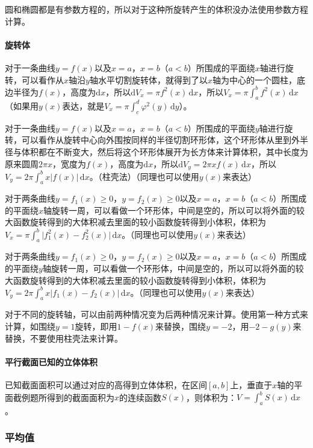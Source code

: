 \documentclass[UTF8, 12pt]{ctexart}
\begin{document}
圆和椭圆都是有参数方程的，所以对于这种所旋转产生的体积没办法使用参数方程计算。

\paragraph{旋转体} \leavevmode \medskip

对于一条曲线$y=f(x)$以及$x=a$，$x=b$（$a<b$）所围成的平面绕$x$轴进行旋转，可以看作从$x$轴沿$y$轴水平切割旋转体，就得到了以$x$轴为中心的一个圆柱，底边半径为$f(x)$，高度为$\textrm{d}x$，所以$\textrm{d}V_x=\pi f^2(x)\,\textrm{d}x$，所以$V_x=\pi\int_a^bf^2(x)\,\textrm{d}x$（如果用$y(x)$表达，就是$V_x=\pi\int_c^d\varphi^2(y)\,\textrm{d}y$）。

对于一条曲线$y=f(x)$以及$x=a$，$x=b$（$a<b$）所围成的平面绕$y$轴进行旋转，可以看作从旋转中心向外围按同样的半径切割环形体，这个环形体从里到外半径与体积都在不断变大，然后将这个环形体展开为长方体来计算体积，其中长度为原来圆周$2\pi x$，宽度为$f(x)$，高度为$\textrm{d}x$，所以$\textrm{d}V_y=2\pi xf(x)\,\textrm{d}x$，所以$V_y=2\pi\int_a^bx\vert f(x)\vert\,\textrm{d}x$。（柱壳法）（同理也可以使用$y(x)$来表达）

对于两条曲线$y=f_1(x)\geqslant0$，$y=f_2(x)\geqslant0$以及$x=a$，$x=b$（$a<b$）所围成的平面绕$x$轴旋转一周，可以看做一个环形体，中间是空的，所以可以将外面的较大函数旋转得到的大体积减去里面的较小函数旋转得到小体积，体积为$V_x=\pi\int_a^b\vert f_1^2(x)-f_2^2(x)\vert\,\textrm{d}x$。（同理也可以使用$y(x)$来表达）

对于两条曲线$y=f_1(x)\geqslant0$，$y=f_2(x)\geqslant0$以及$x=a$，$x=b$（$a<b$）所围成的平面绕$y$轴旋转一周，可以看做一个环形体，中间是空的，所以可以将外面的较大函数旋转得到的大体积减去里面的较小函数旋转得到小体积，体积为$V_y=2\pi\int_a^bx\vert f_1(x)-f_2(x)\vert\,\textrm{d}x$。（同理也可以使用$y(x)$来表达）

对于不同的旋转轴，可以由前两种情况变为后两种情况来计算。使用第一种方式来计算，如围绕$y=1$旋转，即用$1-f(x)$来替换，围绕$y=-2$，用$-2-g(y)$来替换，不要使用柱壳法来计算。

\paragraph{平行截面已知的立体体积} \leavevmode \medskip

已知截面面积可以通过对应的高得到立体体积，在区间$[a,b]$上，垂直于$x$轴的平面截例题所得到的截面面积为$x$的连续函数$S(x)$，则体积为：$V=\int_a^bS(x)\,\textrm{d}x$。

\subsubsection{平均值}
\end{document}

